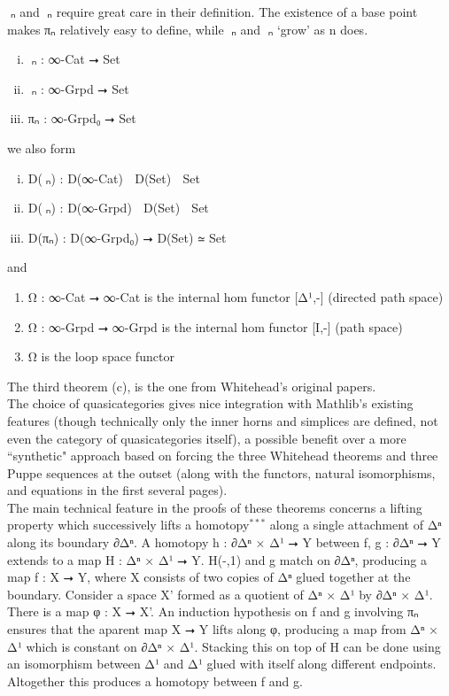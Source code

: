 \documentclass{book}
\theoremstyle{definition}
\begin{document}
π⃗ₙ and π⃡ₙ require great care in their definition. The existence of a base point makes πₙ relatively easy to define, while π⃗ₙ and π⃡ₙ `grow' as n does.

\begin{enumerate}[(i)]
\item π⃗ₙ : ∞-Cat ⭢ Set
\item π⃡ₙ : ∞-Grpd ⭢ Set
\item πₙ : ∞-Grpd₀ ⭢ Set
\end{enumerate}

we also form

\begin{enumerate}[(i)]
\item D⃗(π⃗ₙ) : D⃗(∞-Cat) ⭢ D⃗(Set) ≃ Set
\item D⃡(π⃡ₙ) : D⃡(∞-Grpd) ⭢ D⃡(Set) ≃ Set
\item D(πₙ) : D(∞-Grpd₀) ⭢ D(Set) ≃ Set
\end{enumerate}

and

\begin{enumerate}
\item Ω⃗ : ∞-Cat ⭢ ∞-Cat is the internal hom functor [Δ¹,-] (directed path space)
\item Ω⃡ : ∞-Grpd ⭢ ∞-Grpd is the internal hom functor [I,-] (path space)
\item Ω is the loop space functor
\end{enumerate}

The third theorem (c), is the one from Whitehead's original papers.\\

The choice of quasicategories gives nice integration with Mathlib's existing features (though technically only the inner horns and simplices are defined, not even the category of quasicategories itself), a possible benefit over a more ``synthetic" approach based on forcing the three Whitehead theorems and three Puppe sequences at the outset (along with the functors, natural isomorphisms, and equations in the first several pages). \\

The main technical feature in the proofs of these theorems concerns a lifting property which successively lifts a homotopy${}^{***}$ along a single attachment of Δⁿ along its boundary ∂Δⁿ. A homotopy h : ∂Δⁿ × Δ¹ ⭢ Y between f, g : ∂Δⁿ ⭢ Y extends to a map H : Δⁿ × Δ¹ ⭢ Y. H(-,1) and g match on ∂Δⁿ, producing a map f : X ⭢ Y, where X consists of two copies of Δⁿ glued together at the boundary. Consider a space X' formed as a quotient of Δⁿ × Δ¹ by ∂Δⁿ × Δ¹. There is a map φ : X ⭢ X'. An induction hypothesis on f and g involving πₙ ensures that the aparent map X ⭢ Y lifts along φ, producing a map from Δⁿ × Δ¹ which is constant on ∂Δⁿ × Δ¹. Stacking this on top of H can be done using an isomorphism between Δ¹ and Δ¹ glued with itself along different endpoints. Altogether this produces a homotopy between f and g.\\
\end{document}
